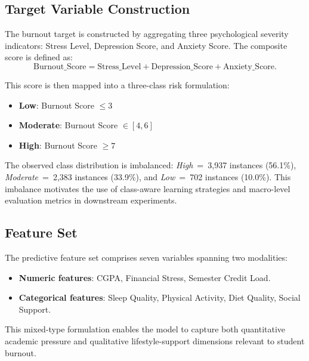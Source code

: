 \documentclass[conference]{IEEEtran}
\begin{document}
\subsection{Target Variable Construction}

The burnout target is constructed by aggregating three psychological severity indicators: Stress Level, Depression Score, and Anxiety Score. The composite score is defined as:
\begin{equation}
    \text{Burnout\_Score} = \text{Stress\_Level} + \text{Depression\_Score} + \text{Anxiety\_Score}.
    \label{eq:burnout_score}
\end{equation}

This score is then mapped into a three-class risk formulation:
\begin{itemize}[leftmargin=*]
    \item \textbf{Low}: Burnout Score $\leq 3$
    \item \textbf{Moderate}: Burnout Score $\in [4, 6]$
    \item \textbf{High}: Burnout Score $\geq 7$
\end{itemize}

The observed class distribution is imbalanced: \textit{High}~=~3{,}937 instances (56.1\%), \textit{Moderate}~=~2{,}383 instances (33.9\%), and \textit{Low}~=~702 instances (10.0\%). This imbalance motivates the use of class-aware learning strategies and macro-level evaluation metrics in downstream experiments.

\subsection{Feature Set}

The predictive feature set comprises seven variables spanning two modalities:

\begin{itemize}[leftmargin=*]
    \item \textbf{Numeric features}: CGPA, Financial Stress, Semester Credit Load.
    \item \textbf{Categorical features}: Sleep Quality, Physical Activity, Diet Quality, Social Support.
\end{itemize}

This mixed-type formulation enables the model to capture both quantitative academic pressure and qualitative lifestyle-support dimensions relevant to student burnout.

\end{document}
